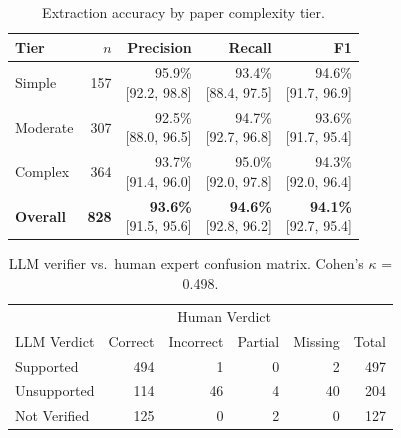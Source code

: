 \documentclass[12pt,a4paper]{article}
\begin{document}
\begin{table}[htbp]
\centering
\caption{Extraction accuracy by paper complexity tier.}
\label{tab:prf_tier}
\begin{tabular}{lrrrr}
\toprule
Tier & $n$ & Precision & Recall & F1 \\
\midrule
  Simple & 157 & \makecell{95.9\%\\\footnotesize{[92.2, 98.8]}} & \makecell{93.4\%\\\footnotesize{[88.4, 97.5]}} & \makecell{94.6\%\\\footnotesize{[91.7, 96.9]}} \\
  Moderate & 307 & \makecell{92.5\%\\\footnotesize{[88.0, 96.5]}} & \makecell{94.7\%\\\footnotesize{[92.7, 96.8]}} & \makecell{93.6\%\\\footnotesize{[91.7, 95.4]}} \\
  Complex & 364 & \makecell{93.7\%\\\footnotesize{[91.4, 96.0]}} & \makecell{95.0\%\\\footnotesize{[92.0, 97.8]}} & \makecell{94.3\%\\\footnotesize{[92.0, 96.4]}} \\
\midrule
  \textbf{Overall} & \textbf{828} & \makecell{\textbf{93.6\%}\\\footnotesize{[91.5, 95.6]}} & \makecell{\textbf{94.6\%}\\\footnotesize{[92.8, 96.2]}} & \makecell{\textbf{94.1\%}\\\footnotesize{[92.7, 95.4]}} \\
\bottomrule
\end{tabular}
\end{table}

\begin{table}[htbp]
\centering
\caption{LLM verifier vs.\ human expert confusion matrix. Cohen's $\kappa$ = 0.498.}
\label{tab:confusion}
\begin{tabular}{lrrrr|r}
\toprule
 & \multicolumn{4}{c|}{Human Verdict} & \\
LLM Verdict & Correct & Incorrect & Partial & Missing & Total \\
\midrule
  Supported & 494 & 1 & 0 & 2 & 497 \\
  Unsupported & 114 & 46 & 4 & 40 & 204 \\
  Not Verified & 125 & 0 & 2 & 0 & 127 \\
\bottomrule
\end{tabular}
\end{table}
\end{document}
